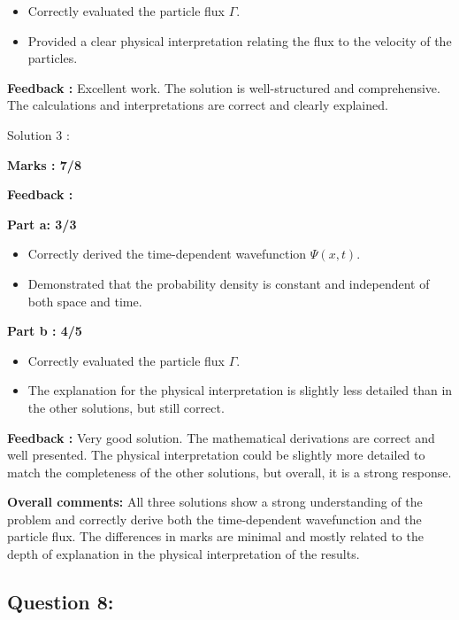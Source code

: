 \documentclass[a4paper,11pt]{article}
\begin{document}
\begin{itemize}
    \item Correctly evaluated the particle flux $\Gamma$.
    \item Provided a clear physical interpretation relating the flux to the velocity of the particles.
\end{itemize}

\textbf{Feedback :}
Excellent work. The solution is well-structured and comprehensive. The calculations and interpretations are correct and clearly explained.


Solution 3 :

\textbf{Marks : 7/8}

\textbf{Feedback :}

\textbf{Part a: 3/3}
\begin{itemize}
    \item Correctly derived the time-dependent wavefunction $\Psi (x,t)$.
    \item Demonstrated that the probability density is constant and independent of both space and time.
\end{itemize}

\textbf{Part b : 4/5}

\begin{itemize}
    \item Correctly evaluated the particle flux $\Gamma$.
    \item The explanation for the physical interpretation is slightly less detailed than in the other solutions, but still correct.
\end{itemize}

\textbf{Feedback :}
Very good solution. The mathematical derivations are correct and well presented. The physical interpretation could be slightly more detailed to match the completeness of the other solutions, but overall, it is a strong response.

\textbf{Overall comments:}
All three solutions show a strong understanding of the problem and correctly derive both the time-dependent wavefunction and the particle flux. The differences in marks are minimal and mostly related to the depth of explanation in the physical interpretation of the results.





\subsection*{Question 8:}
\end{document}
